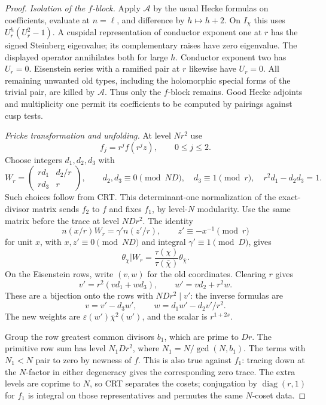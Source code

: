 \begin{proof}
\emph{Isolation of the \(f\)-block.}
Apply \(\mathcal A\) by the usual Hecke formulas on coefficients,
evaluate at \(n=\ell\), and difference by \(h\mapsto h+2\).
On \(I_\chi\) this uses \(U_r^h(U_r^2-1)\).
A cuspidal representation of conductor exponent one at \(r\)
has the signed Steinberg eigenvalue; its complementary raises
have zero eigenvalue. The displayed operator annihilates both
for large \(h\). Conductor exponent two has \(U_r=0\).
Eisenstein series with a ramified pair at \(r\) likewise have
\(U_r=0\). All remaining unwanted old types, including the
holomorphic special forms of the trivial pair, are killed by
\(\mathcal A\). Thus only the \(f\)-block remains. Good Hecke
adjoints and multiplicity one permit its coefficients to be
computed by pairings against cusp tests.

\emph{Fricke transformation and unfolding.}
At level \(Nr^2\) use
\[
 f_j=r^jf(r^jz),\qquad 0\le j\le2.
\]
Choose integers \(d_1,d_2,d_3\) with
\[
 W_r=\begin{pmatrix}rd_1&d_2/r\\rd_3&r\end{pmatrix},\qquad
 d_2,d_3\equiv0\pmod{ND},\quad d_3\equiv1\pmod r,\quad
 r^2d_1-d_2d_3=1.
\]
Such choices follow from CRT. This determinant-one normalization
of the exact-divisor matrix sends \(f_2\) to \(f\) and fixes \(f_1\),
by level-\(N\) modularity. Use the same matrix before the trace
at level \(NDr^2\). The identity
\[
 n(x/r)W_r=\gamma'n(z'/r),\qquad
 z'\equiv-x^{-1}\pmod r
\]
for unit \(x\), with \(x,z'\equiv0\pmod{ND}\) and integral
\(\gamma'\equiv1\pmod D\), gives
\[
 \theta_\chi\big|W_r
   =\frac{\tau(\chi)}{\tau(\bar\chi)}\theta_{\bar\chi}.
\]
On the Eisenstein rows, write \((v,w)\) for the old coordinates.
Clearing \(r\) gives
\[
 v'=r^2(vd_1+wd_3),\qquad
 w'=vd_2+r^2w.
\]
These are a bijection onto the rows with \(NDr^2\mid v'\):
the inverse formulas are
\[
 v=v'-d_3w',\qquad
 w=d_1w'-d_2v'/r^2.
\]
The new weights are \(\varepsilon(w')\bar\chi^2(w')\), and the
scalar is \(r^{1+2s}\).

Group the row greatest common divisors \(b_1\), which are prime
to \(Dr\). The primitive row sum has level
\(N_1Dr^2\), where \(N_1=N/\gcd(N,b_1)\).
The terms with \(N_1<N\) pair to zero by newness of \(f\).
This is also true against \(f_1\): tracing down at the \(N\)-factor
in either degeneracy gives the corresponding zero trace. The
extra levels are coprime to \(N\), so CRT separates the cosets;
conjugation by \(\operatorname{diag}(r,1)\) for \(f_1\) is integral
on those representatives and permutes the same \(N\)-coset data.


\end{proof}
